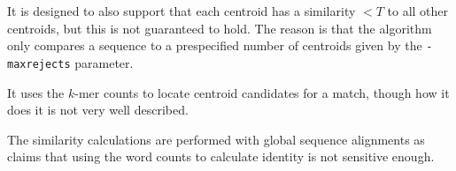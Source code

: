 It is designed to also support that each centroid has a similarity $<T$ to all
other centroids, but this is not guaranteed to hold. The reason is that the
algorithm only compares a sequence to a prespecified number of centroids given
by the \texttt{-maxrejects} parameter.

It uses the $k$-mer counts to locate centroid candidates for a match, though
how it does it is not very well described.

The similarity calculations are performed with global sequence alignments as
\cite{usearch} claims that using the word counts to calculate identity is not
sensitive enough.

